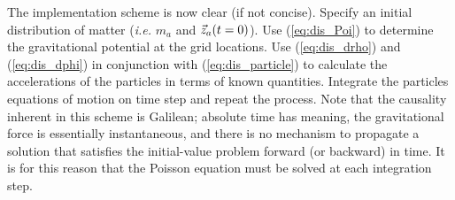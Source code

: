 The implementation scheme is now clear (if not concise).  Specify an initial
distribution of matter ({\it i.e.} $m_a$ and ${\vec z}_a(t=0)$).  Use
(\ref{eq:dis_Poi}) to determine the gravitational potential at the grid
locations.  Use (\ref{eq:dis_drho}) and (\ref{eq:dis_dphi}) in conjunction with
(\ref{eq:dis_particle}) to calculate the accelerations of the particles in
terms of known quantities.  Integrate the particles equations of motion on time
step and repeat the process.  Note that the causality inherent in this scheme
is Galilean; absolute time has meaning, the gravitational force is essentially
instantaneous, and there is no mechanism to propagate a solution that satisfies
the initial-value problem forward (or backward) in time.  It is for this reason
that the Poisson equation must be solved at each integration step.
